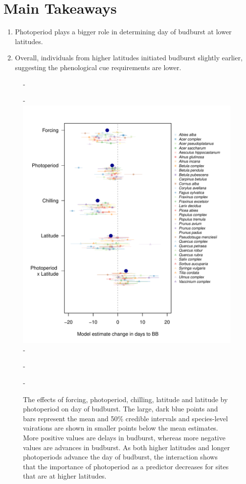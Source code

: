 \documentclass{article}\usepackage[]{graphicx}\usepackage[]{color}
\begin{document}
\section*{Main Takeaways}
\begin{enumerate}
\item Photoperiod plays a bigger role in determining day of budburst at lower latitudes.
\item Overall, individuals from higher latitudes initiated budburst slightly earlier, suggesting the phenological cue requirements are lower. 
\end{enumerate}




{\begin{figure} [H]
  -\begin{center}
  -\includegraphics[width=14cm]{..//figures/latanalysis_spcom_expramp_fp.pdf}
  -\caption{The effects of forcing, photoperiod, chilling, latitude and latitude by photoperiod on day of budburst. The large, dark blue points and bars represent the mean and 50\% credible intervals and species-level vairations are shown in smaller points below the mean estimates. More positive values are delays in budburst, whereas more negative values are advances in budburst. As both higher latitudes and longer photoperiods advance the day of budburst, the interaction shows that the importance of photoperiod as a predictor decreases for sites that are at higher latitudes.  }\label{fig:modelest}
  -\end{center}
  -\end{figure}}
\end{document}
